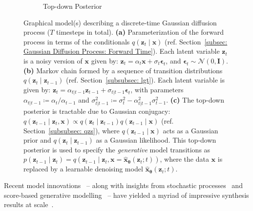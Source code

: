 \begin{figure}[!t]
\begin{subfigure}{.34\columnwidth}
        \caption{Top-down Posterior}
        \label{fig: tdp}
    \end{subfigure}
    \caption{Graphical model(s) describing a discrete-time Gaussian diffusion process ($T$ timesteps in total). \textbf{(a)} Parameterization of the forward process in terms of the conditionals $q(\mathbf{z}_t \mid \mathbf{x})$ (ref. Section~\ref{subsec: Gaussian Diffusion Process: Forward Time}). Each latent variable $\mathbf{z}_t$ is a noisy version of $\mathbf{x}$ given by: $\mathbf{z}_t = \alpha_t \mathbf{x} + \sigma_t \boldsymbol{\epsilon}_t$, and $\boldsymbol{\epsilon}_t \sim \mathcal{N}(0, \mathbf{I})$. \textbf{(b)} Markov chain formed by a sequence of transition distributions $q(\mathbf{z}_t \mid \mathbf{z}_{t-1})$ (ref. Section~\ref{subsubsec: lgt}). Each latent variable is given by: $\mathbf{z}_t = \alpha_{t|t-1} \mathbf{z}_{t-1} + \sigma_{t|t-1} \boldsymbol{\epsilon}_t$, with parameters $\alpha_{t|t-1} \coloneqq \alpha_{t} / \alpha_{t-1}$ and $\sigma^2_{t|t-1} \coloneqq \sigma^2_{t} - \alpha^2_{t|t-1}\sigma^2_{t-1}$. \textbf{(c)} The top-down posterior is tractable due to Gaussian conjugacy: $q(\mathbf{z}_{t-1} \mid \mathbf{z}_t, \mathbf{x}) \propto q(\mathbf{z}_{t} \mid \mathbf{z}_{t-1})q(\mathbf{z}_{t-1} \mid \mathbf{x})$ (ref. Section~\ref{subsubsec: qzs}), where $q(\mathbf{z}_{t-1} \mid \mathbf{x})$ acts as a Gaussian prior and $q(\mathbf{z}_{t} \mid \mathbf{z}_{t-1})$ as a Gaussian likelihood.  
    This top-down posterior is used to specify the \textit{generative} model transitions as $p(\mathbf{z}_{t-1} \mid \mathbf{z}_{t}) = q(\mathbf{z}_{t-1} \mid \mathbf{z}_{t}, \mathbf{x} = \hat{\mathbf{x}}_{\boldsymbol{\theta}}(\mathbf{z}_t; t))$, where the data $\mathbf{x}$ is replaced by a learnable denoising model $\hat{\mathbf{x}}_{\boldsymbol{\theta}}(\mathbf{z}_t; t)$. 
    }
    \label{fig: diffusion_process}
    \hfill
\end{figure}

\newpage
Recent model innovations~\citep{ho2020denoising} -- along with insights from stochastic processes~\citep{anderson1982reverse} and score-based generative modelling~\citep{hyvarinen2005estimation,vincent2011connection,song2019generative,song2021scorebased} -- have yielded a myriad of impressive synthesis results at scale~\citep{nichol2021improved,dhariwal2021diffusion,nichol2022glide,ho2022cascaded,rombach2022high,saharia2022photorealistic,hoogeboom2022equivariant}. 
%

